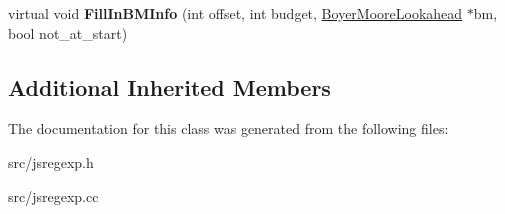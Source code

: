 \begin{DoxyCompactItemize}
\item 
\hypertarget{classv8_1_1internal_1_1_back_reference_node_a1e9e17f26810c11345529edbf4d106ae}{}virtual void {\bfseries Fill\+In\+B\+M\+Info} (int offset, int budget, \hyperlink{classv8_1_1internal_1_1_boyer_moore_lookahead}{Boyer\+Moore\+Lookahead} $\ast$bm, bool not\+\_\+at\+\_\+start)\label{classv8_1_1internal_1_1_back_reference_node_a1e9e17f26810c11345529edbf4d106ae}

\end{DoxyCompactItemize}
\subsection*{Additional Inherited Members}


The documentation for this class was generated from the following files\+:\begin{DoxyCompactItemize}
\item 
src/jsregexp.\+h\item 
src/jsregexp.\+cc\end{DoxyCompactItemize}

